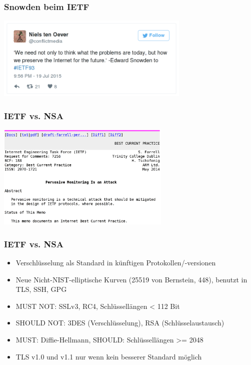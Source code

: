 \documentclass[12pt, xcolor={svgnames,table}]{beamer}
\begin{document}
\begin{frame}
  \frametitle{Snowden beim IETF}
    \begin{center}
      \includegraphics[height=4cm]{img/snowden-ietf.png}
    \end{center}
\end{frame}

\begin{frame}
  \frametitle{IETF vs. NSA}
    \begin{center}
      \includegraphics[height=5cm]{img/ietf-nsa.png}
    \end{center}
\end{frame}

\begin{frame}
  \frametitle{IETF vs. NSA}
    \footnotesize
    \begin{itemize}
      \item Verschlüsselung als Standard in künftigen Protokollen/-versionen
      \item Neue Nicht-NIST-elliptische Kurven (25519 von Bernstein, 448), benutzt in TLS, SSH, GPG
      \item MUST NOT: SSLv3, RC4, Schlüssellängen < 112 Bit
      \item SHOULD NOT: 3DES (Verschlüsselung), RSA (Schlüsselaustausch)
      \item MUST: Diffie-Hellmann, SHOULD: Schlüssellängen >= 2048
      \item TLS v1.0 und v1.1 nur wenn kein besserer Standard möglich
    \end{itemize}
\end{frame}
\end{document}
